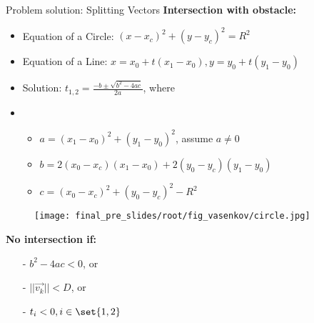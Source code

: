     \begin{frame}{Problem solution: Splitting Vectors}
    \textbf{\large Intersection with obstacle:}
    \begin{itemize}
      \item Equation of a Circle: $(x - x_c)^2 + (y - y_c)^2 = R^2$
      \item Equation of a Line: $x = x_0 + t(x_1 - x_0), y = y_0 + t(y_1 - y_0)$
      \item Solution: $t_{1,2} = \frac{-b \pm \sqrt{b^2 - 4ac}}{2a}$, where
      \item \begin{itemize}
          \item $a = (x_1 - x_0)^2 + (y_1 - y_0)^2$, assume $a \neq 0$
          
          \vspace{0.1cm}
          \item $b = 2(x_0 - x_c)(x_1 - x_0) + 2(y_0 - y_c)(y_1 - y_0)$
          
          \vspace{0.1cm}
          \item $c = (x_0 - x_c)^2 + (y_0 - y_c)^2 - R^2$ 
      \end{itemize}
    \end{itemize}
    \vspace{0.5cm}
    
    \begin{wrapfigure}{r}{0.55\textwidth}
      \vspace{-1.4cm}
      \begin{center}
        \texttt{[image: final\_pre\_slides/root/fig\_vasenkov/circle.jpg]}
      \end{center}
    \end{wrapfigure}
    
    \textbf{\large No intersection if:}
    \begin{itemize}
        \item[-] $b^2-4ac < 0$, or
        \item[-] $||\vec{v_k}|| < D$, or
        \item[-] $t_i < 0, i \in \set{1,2}$
    \end{itemize}
    \end{frame}
    

